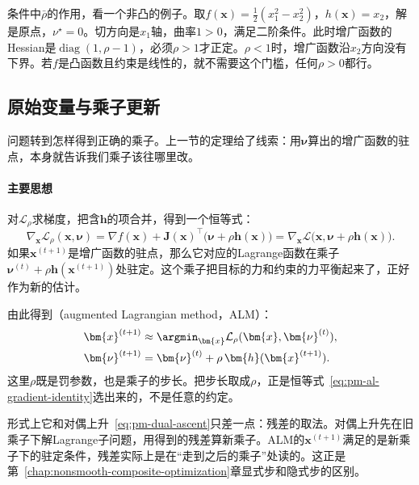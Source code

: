 条件中$\bar\rho$的作用，看一个非凸的例子。取$f(\bm{x})=\tfrac12(x_1^2-x_2^2)$，$h(\bm{x})=x_2$，解是原点，$\nu^\star=0$。切方向是$x_1$轴，曲率$1>0$，满足二阶条件。此时增广函数的Hessian是$\operatorname{diag}(1,\rho-1)$，必须$\rho>1$才正定。$\rho<1$时，增广函数沿$x_2$方向没有下界。若$f$是凸函数且约束是线性的，就不需要这个门槛，任何$\rho>0$都行。

\subsection{原始变量与乘子更新}
\label{sec:pm-alm-update}

问题转到怎样得到正确的乘子。上一节的定理给了线索：用$\bm{\nu}$算出的增广函数的驻点，本身就告诉我们乘子该往哪里改。

\paragraph{主要思想}
对$\mathcal{L}_\rho$求梯度，把含$\bm{h}$的项合并，得到一个恒等式：
\begin{equation}
 \nabla_{\bm{x}}\mathcal{L}_\rho(\bm{x},\bm{\nu})=\nabla f(\bm{x})+\bm{J}(\bm{x})^\top\bigl(\bm{\nu}+\rho\bm{h}(\bm{x})\bigr)=\nabla_{\bm{x}}\mathcal{L}\bigl(\bm{x},\bm{\nu}+\rho\bm{h}(\bm{x})\bigr).
 \label{eq:pm-al-gradient-identity}
\end{equation}
如果$\bm{x}^{(t+1)}$是增广函数的驻点，那么它对应的Lagrange函数在乘子$\bm{\nu}^{(t)}+\rho\bm{h}(\bm{x}^{(t+1)})$处驻定。这个乘子把目标的力和约束的力平衡起来了，正好作为新的估计。

由此得到（augmented Lagrangian method，ALM）：
\begin{equation}
 \begin{aligned}
 \bm{x}^{(t+1)}&\approx\argmin_{\bm{x}}\mathcal{L}_{\rho}(\bm{x},\bm{\nu}^{(t)}),\\
 \bm{\nu}^{(t+1)}&=\bm{\nu}^{(t)}+\rho\,\bm{h}(\bm{x}^{(t+1)}).
 \end{aligned}
 \label{eq:pm-alm}
\end{equation}
这里$\rho$既是罚参数，也是乘子的步长。把步长取成$\rho$，正是恒等式~\eqref{eq:pm-al-gradient-identity}选出来的，不是任意的约定。

形式上它和对偶上升~\eqref{eq:pm-dual-ascent}只差一点：残差的取法。对偶上升先在旧乘子下解Lagrange子问题，用得到的残差算新乘子。ALM的$\bm{x}^{(t+1)}$满足的是新乘子下的驻定条件，残差实际上是在“走到之后的乘子”处读的。这正是第~\ref{chap:nonsmooth-composite-optimization}章显式步和隐式步的区别。

